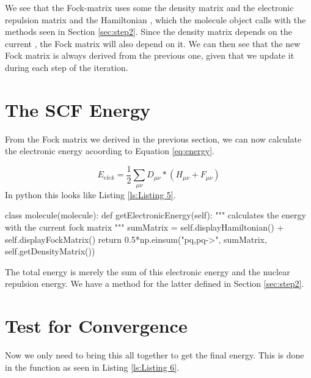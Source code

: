  
We see that the Fock-matrix uses some the density matrix and the electronic 
repulsion matrix and the Hamiltonian , which the molecule object calls with the 
methods seen in Section \ref{sec:step2}. Since the density matrix depends on the 
current , the Fock matrix will also depend on it. 
We can then see that the new Fock matrix is always derived from the previous one, 
given that we update it during each step of the iteration.
 
 \section{The SCF Energy}
 \label{sec:step5}
 From the Fock matrix we derived in the previous section, we can now calculate the electronic energy acoording to Equation \eqref{eq:energy}.
 
 \begin{equation} \label{eq:energy}
     E_{elek} = \frac{1}{2}\sum_{\mu\nu}D_{\mu\nu}*(H_{\mu\nu} + F_{\mu\nu})
 \end{equation}
 In python this looks like Listing \ref{ls:Listing 5}.
 
 
    
\begin{python}[caption={calculating the energy},label={ls:Listing 5}]
    class molecule(molecule):
        def getElectronicEnergy(self):
            """
            calculates the energy with the current fock matrix
            """
            sumMatrix = self.displayHamiltonian() 
                    + self.displayFockMatrix()
            return 0.5*np.einsum("pq,pq->", sumMatrix, 
                            self.getDensityMatrix())
\end{python}

The total energy is merely the sum of this electronic energy and the nuclear 
repulsion energy. We have a method for the latter defined in Section 
\ref{sec:step2}.
 
 \section{Test for Convergence}
 \label{sec:step6}
Now we only need to bring this all together to get the final energy. 
This is done in the function  as seen in Listing 
\ref{ls:Listing 6}.

 
   
